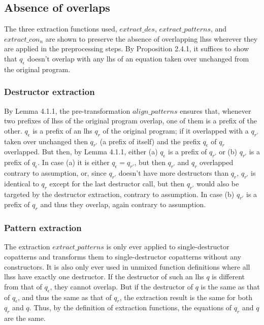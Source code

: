 \subsection{Absence of overlaps}

The three extraction functions used, $extract\_des$, $extract\_patterns$, and $extract\_con_n$ are shown to preserve the absence of overlapping lhss wherever they are applied in the preprocessing steps. By Proposition 2.4.1, it suffices to show that $q_\epsilon$ doesn't overlap with any lhs of an equation taken over unchanged from the original program.

\subsubsection{Destructor extraction}

By Lemma 4.1.1, the pre-transformation $align\_patterns$ ensures that, whenever two prefixes of lhss of the original program overlap, one of them is a prefix of the other. $q_\epsilon$ is a prefix of an lhs $q_r$ of the original program; if it overlapped with a $q_{r'}$ taken over unchanged then $q_{r'}$ (a prefix of itself) and the prefix $q_\epsilon$ of $q_r$ overlapped. But then, by Lemma 4.1.1, either (a) $q_\epsilon$ is a prefix of $q_{r'}$ or (b) $q_{r'}$ is a prefix of $q_\epsilon$. In case (a) it is either $q_\epsilon = q_{r'}$, but then $q_{r'}$ and $q_r$ overlapped contrary to assumption, or, since $q_{r'}$ doesn't have more destructors than $q_r$, $q_{r'}$ is identical to $q_r$ except for the last destructor call, but then $q_{r'}$ would also be targeted by the destructor extraction, contrary to assumption. In case (b) $q_{r'}$ is a prefix of $q_r$ and thus they overlap, again contrary to assumption.

\subsubsection{Pattern extraction}

The extraction $extract\_patterns$ is only ever applied to single-destructor copatterns and transforms them to single-destructor copatterns without any constructors. It is also only ever used in unmixed function definitions where all lhss have exactly one destructor. If the destructor of such an lhs $q$ is different from that of $q_\epsilon$, they cannot overlap. But if the destructor of $q$ is the same as that of $q_\epsilon$, and thus the same as that of $q_r$, the extraction result is the same for both $q_r$ and $q$. Thus, by the definition of extraction functions, the equations of $q_r$ and $q$ are the same.

